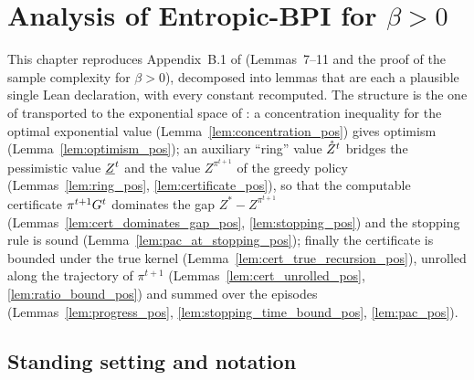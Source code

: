\chapter{Analysis of Entropic-BPI for \texorpdfstring{$\beta > 0$}{beta > 0}}
\label{chap:analysis_pos}

This chapter reproduces Appendix~B.1 of \cite{essakine2026tight} (Lemmas~7--11 and the proof
of the sample complexity for $\beta > 0$), decomposed into lemmas that are each a plausible
single Lean declaration, with every constant recomputed. The structure is the one of
\cite{menard2021fast} transported to the exponential space of \cite{fei2021exponential}: a
concentration inequality for the optimal exponential value (Lemma~\ref{lem:concentration_pos})
gives optimism (Lemma~\ref{lem:optimism_pos}); an auxiliary ``ring'' value
$\mathring{Z}^t$ bridges the pessimistic value $\underline{Z}^t$ and the value $Z^{\pi^{t+1}}$ of the greedy
policy (Lemmas~\ref{lem:ring_pos}, \ref{lem:certificate_pos}), so that the computable
certificate $\pi^{t+1}G^t$ dominates the gap $Z^* - Z^{\pi^{t+1}}$
(Lemmas~\ref{lem:cert_dominates_gap_pos}, \ref{lem:stopping_pos}) and the stopping rule is
sound (Lemma~\ref{lem:pac_at_stopping_pos}); finally the certificate is bounded under the true
kernel (Lemma~\ref{lem:cert_true_recursion_pos}), unrolled along the trajectory of $\pi^{t+1}$
(Lemmas~\ref{lem:cert_unrolled_pos}, \ref{lem:ratio_bound_pos}) and summed over the episodes
(Lemmas~\ref{lem:progress_pos}, \ref{lem:stopping_time_bound_pos}, \ref{lem:pac_pos}).

\section{Standing setting and notation}
\label{sec:pos_setting}

